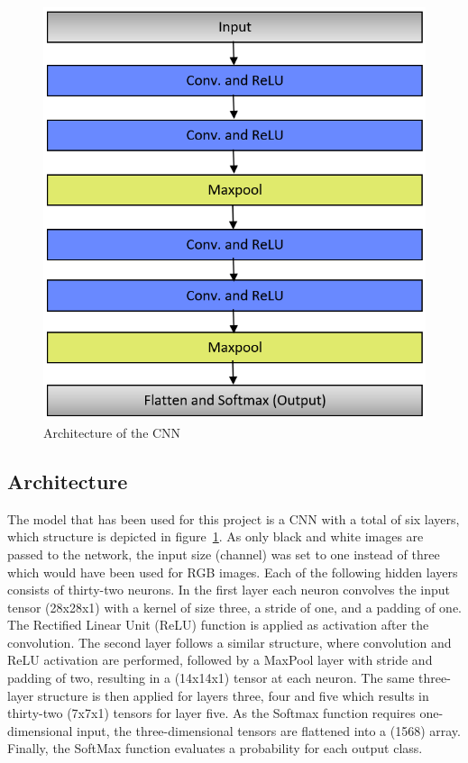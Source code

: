 \documentclass[@CLASSOPTIONS@]{tumarticle}
\begin{document}
\begin{figure}
    \begin{minipage}{0.48\textwidth}
     \centering
     \includegraphics[width=.9\linewidth]{figures/CNN_Arch_5}
     \caption{Architecture of the CNN}\label{Fig:CNN_A}
   \end{minipage}
\end{figure}

\subsection{Architecture}

The model that has been used for this project is a CNN with a total of six layers, which structure is depicted in
figure~\ref{Fig:CNN_A}.
As only black and white images are passed to the network, the input size (channel) was set to one instead of three which
would have been used for RGB images.
Each of the following hidden layers consists of thirty-two neurons.
In the first layer each neuron convolves the input tensor (28x28x1) with a kernel of size three, a stride of one, and
a padding of one.
The Rectified Linear Unit (ReLU) function is applied as activation after the convolution.
The second layer follows a similar structure, where convolution and ReLU activation are performed, followed by a MaxPool
layer with stride and padding of two, resulting in a (14x14x1) tensor at each neuron.
The same three-layer structure is then applied for layers three, four and five which results in thirty-two (7x7x1) tensors for
layer five.
As the Softmax function requires one-dimensional input, the three-dimensional tensors are flattened into a (1568) array.
Finally, the SoftMax function evaluates a probability for each output class.
\end{document}

